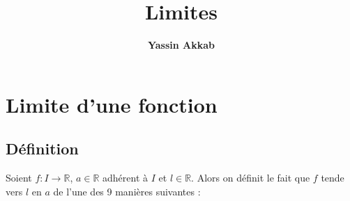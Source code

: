\documentclass{article}
\title{\textbf{Limites}}
\author{\textbf{Yassin Akkab}}
\begin{document}
	
	\maketitle
	
	
	
	\tableofcontents
	
	\newpage

	
	\section{Limite d’une fonction}
	\subsection{Définition}
		Soient $f : I \to \mathbb{R}$, $a \in \mathbb{R}$ adhérent à $I$ et $l \in \mathbb{R}$. Alors on définit le fait que $f$ tende vers $l$ en $a$ de l’une des 9 manières suivantes :
\end{document}
